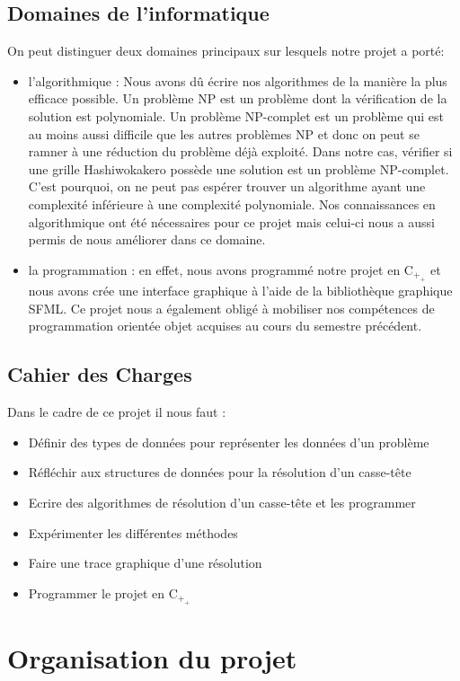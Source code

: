 \documentclass[french]{article}
\begin{document}
    \subsection{\Large Domaines de l'informatique}
    On peut distinguer deux domaines principaux sur lesquels notre projet a porté:
    \begin{itemize}
        \item l'algorithmique : Nous avons dû écrire nos algorithmes de la manière la plus efficace possible. Un problème NP est un problème dont la vérification de la solution est polynomiale. Un problème NP-complet est un problème qui est au moins aussi difficile que les autres problèmes NP et donc on peut se ramner à une réduction du problème déjà exploité. Dans notre cas, vérifier si une grille Hashiwokakero possède une solution est un problème NP-complet. C'est pourquoi, on ne peut pas espérer trouver un algorithme ayant une complexité inférieure à une complexité polynomiale. Nos connaissances en algorithmique ont été nécessaires pour ce projet mais celui-ci nous a aussi permis de nous améliorer dans ce domaine.
        \item la programmation : en effet, nous avons programmé notre projet en C$_+_+$ et nous avons crée une interface graphique à l'aide de la bibliothèque graphique SFML. Ce projet nous a également obligé à mobiliser nos compétences de programmation orientée objet acquises au cours du semestre précédent.
    \end{itemize}
   \subsection{\Large Cahier des Charges}
   Dans le cadre de ce projet il nous faut :
   \begin{itemize}
       \item Définir des types de données pour représenter les données d'un problème
       \item Réfléchir aux structures de données pour la résolution d'un casse-tête
       \item Ecrire des algorithmes de résolution d'un casse-tête et les programmer
       \item Expérimenter les différentes méthodes
       \item Faire une trace graphique d'une résolution
       \item Programmer le projet en C$_+_+$
   \end{itemize}
   
\section{\LARGE Organisation du projet}
\end{document}
